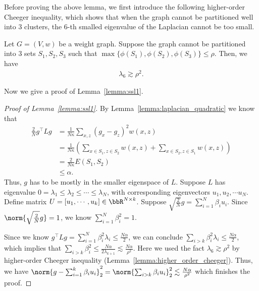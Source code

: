 Before proving the above lemma, we first introduce the following higher-order Cheeger inequality, which shows that when the graph cannot be partitioned well into $3$ clusters, the $6$-th smalled eigenvalue of the Laplacian cannot be too small. %
\begin{lemma}\label{lemma:higher_order_cheeger}
	Let $G=(V, w)$ be a weight graph.  Suppose the graph cannot be partitioned into $3$ sets $S_1, S_2, S_3$ such that $\max\{\phi(S_1), \phi(S_2), \phi(S_3)\} \le \rho$. Then, we have
	\begin{align*}
		 \lambda_{6} \gtrsim\rho^2.
	\end{align*}
\end{lemma}

Now we give a proof of Lemma~\ref{lemma:ssl1}.
\begin{proof}[Proof of Lemma~\ref{lemma:ssl1}]
	By Lemma~\ref{lemma:laplacian_quadratic} we know that 
\begin{align}
	\frac{2}{N} g^\top L g &= \frac{1}{N\kappa} \sum_{x, z} (g_x - g_z)^2 w(x, z)\\
	&= \frac{1}{N\kappa} \left(\sum_{x\in S_1, z\in S_2} w(x, z) + \sum_{x\in S_2, z\in S_1} w(x, z)\right)\\
	&= \frac{2}{N\kappa} E(S_1, S_2) \\
	&\le \alpha.
\end{align}
Thus, $g$ has to be mostly in the smaller eigenspace of $L$.  Suppose $L$ has eigenvalue $0=\lambda_1\le\lambda_2 \le \cdots \le \lambda_N $, with corresponding eigenvectors $u_1, u_2, \cdots u_N$. Define matrix $U=[u_1, \cdots, u_k] \in \bbR^{N\times k}$. Suppose $\sqrt{\frac{2}{N}}g = \sum_{i=1}^N \beta_i u_i$. Since $\norm{\sqrt{\frac{2}{N}}g}=1$, we know $\sum_{i=1}^N \beta_i^2 = 1$.

Since we know $g^\top L g = \sum_{i=1}^N \beta_i^2 \lambda_i \le \frac{N\alpha}{2}$, we can conclude $\sum_{i>k} \beta_i^2 \lambda_i \le \frac{N\alpha}{2}$, which implies that $\sum_{i>k}\beta_i^2 \le \frac{N\alpha}{2\lambda_{k+1}} \lesssim \frac{N\alpha}{\rho^2}$. Here we used the fact $\lambda_6 \gtrsim \rho^2$ by higher-order Cheeger inequality (Lemma~\ref{lemma:higher_order_cheeger}). Thus, we have $\norm{g-\sum_{i=1}^k \beta_i u_i}_2^2 = \norm{\sum_{i>k} \beta_i u_i}_2^2 \lesssim \frac{N\alpha}{\rho^2}$ which finishes the proof. 
\end{proof}

